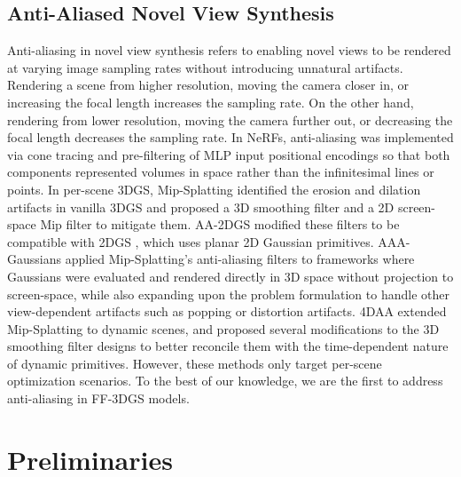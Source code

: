 \documentclass[runningheads]{llncs}
\begin{document}
\subsection{Anti-Aliased Novel View Synthesis}
\label{sec:rel-works-aa-nvs}
Anti-aliasing in novel view synthesis refers to enabling novel views to be rendered at varying image sampling rates without introducing unnatural artifacts. Rendering a scene from higher resolution, moving the camera closer in, or increasing the focal length increases the sampling rate. On the other hand, rendering from lower resolution, moving the camera further out, or decreasing the focal length decreases the sampling rate.
In NeRFs, anti-aliasing was implemented via cone tracing and pre-filtering of MLP input positional encodings so that both components represented volumes in space rather than the infinitesimal lines or points\cite{barron2021mip,barron2022mip}.
In per-scene 3DGS, Mip-Splatting \cite{yu2024mip} identified the erosion and dilation artifacts in vanilla 3DGS \cite{kerbl20233d} and proposed a 3D smoothing filter and a 2D screen-space Mip filter to mitigate them.
AA-2DGS \cite{younes2025anti} modified these filters to be compatible with 2DGS \cite{huang20242d}, which uses planar 2D Gaussian primitives.
AAA-Gaussians \cite{steiner2025aaa} applied Mip-Splatting's anti-aliasing filters to frameworks where Gaussians were evaluated and rendered directly in 3D space without projection to screen-space, while also expanding upon the problem formulation to handle other view-dependent artifacts such as popping or distortion artifacts.
4DAA \cite{chen2025alias} extended Mip-Splatting \cite{yu2024mip} to dynamic scenes, and proposed several modifications to the 3D smoothing filter designs to better reconcile them with the time-dependent nature of dynamic primitives.
However, these methods only target per-scene optimization scenarios. To the best of our knowledge, we are the first to address anti-aliasing in FF-3DGS models.


\section{Preliminaries}
\end{document}
